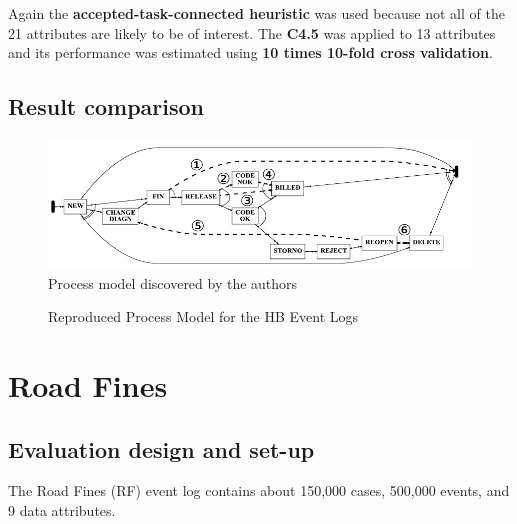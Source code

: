 \noindent
Again the \textbf{accepted-task-connected heuristic} was used because not all of the 21 attributes are likely to be of interest. The \textbf{C4.5} was applied to 13 attributes and its performance was estimated using \textbf{10 times 10-fold cross validation}.\cite{Mannhardt2018b}

\subsection{Result comparison}

\begin{figure}[H]
\includegraphics[width=1\textwidth]{Chapters/Graphics_Paper/HBresults.jpg}
\caption{Process model discovered by the authors \protect\cite{Mannhardt17}} 
\end{figure}

\begin{figure}[H]
\caption{Reproduced Process Model for the HB Event Logs} 
\end{figure}



\section{Road Fines}
\subsection{Evaluation design and set-up}
The Road Fines (RF) event log contains about 150,000 cases, 500,000 events, and 9 data attributes.\\



